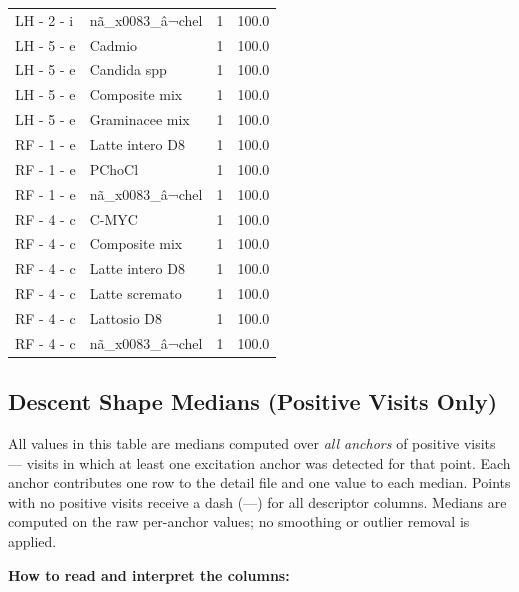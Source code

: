 \documentclass[a4paper,11pt]{article}
\begin{document}
\begin{footnotesize}
\begin{longtable}{p{3.5cm}p{7.5cm}rr}
LH - 2 - i & nã\_x0083\_â¬chel & 1 & 100.0 \\
LH - 5 - e & Cadmio & 1 & 100.0 \\
LH - 5 - e & Candida spp & 1 & 100.0 \\
LH - 5 - e & Composite mix & 1 & 100.0 \\
LH - 5 - e & Graminacee mix & 1 & 100.0 \\
RF - 1 - e & Latte intero D8 & 1 & 100.0 \\
RF - 1 - e & PChoCl & 1 & 100.0 \\
RF - 1 - e & nã\_x0083\_â¬chel & 1 & 100.0 \\
RF - 4 - c & C-MYC & 1 & 100.0 \\
RF - 4 - c & Composite mix & 1 & 100.0 \\
RF - 4 - c & Latte intero D8 & 1 & 100.0 \\
RF - 4 - c & Latte scremato & 1 & 100.0 \\
RF - 4 - c & Lattosio D8 & 1 & 100.0 \\
RF - 4 - c & nã\_x0083\_â¬chel & 1 & 100.0 \\
\end{longtable}
\end{footnotesize}

\subsection{Descent Shape Medians (Positive Visits Only)}

All values in this table are medians computed over \emph{all anchors} of positive visits ---
visits in which at least one excitation anchor was detected for that point. Each anchor
contributes one row to the detail file and one value to each median. Points with no positive
visits receive a dash (---) for all descriptor columns.
Medians are computed on the raw per-anchor values; no smoothing or outlier removal is
applied.

\medskip
\noindent\textbf{How to read and interpret the columns:}
\end{document}
